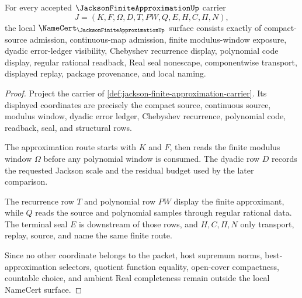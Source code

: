 \begin{theorem}
\label{thm:jackson-finite-approximation-namecert-obligations}
For every accepted $\JacksonFiniteApproximationUp$ carrier
$$
J=(K,F,\Omega,D,T,PW,Q,E,H,C,\Pi,N),
$$
the local $\NameCert_{\JacksonFiniteApproximationUp}$ surface consists exactly of compact-source admission, continuous-map admission, finite modulus-window exposure, dyadic error-ledger visibility, Chebyshev recurrence display, polynomial code display, regular rational readback, Real seal nonescape, componentwise transport, displayed replay, package provenance, and local naming.
\end{theorem}
\begin{proof}
Project the carrier of \autoref{def:jackson-finite-approximation-carrier}. Its displayed coordinates are precisely the compact source, continuous source, modulus window, dyadic error ledger, Chebyshev recurrence, polynomial code, readback, seal, and structural rows.

The approximation route starts with $K$ and $F$, then reads the finite modulus window $\Omega$ before any polynomial window is consumed. The dyadic row $D$ records the requested Jackson scale and the residual budget used by the later comparison.

The recurrence row $T$ and polynomial row $PW$ display the finite approximant, while $Q$ reads the source and polynomial samples through regular rational data. The terminal seal $E$ is downstream of those rows, and $H,C,\Pi,N$ only transport, replay, source, and name the same finite route.

Since no other coordinate belongs to the packet, host supremum norms, best-approximation selectors, quotient function equality, open-cover compactness, countable choice, and ambient Real completeness remain outside the local NameCert surface.
\end{proof}

